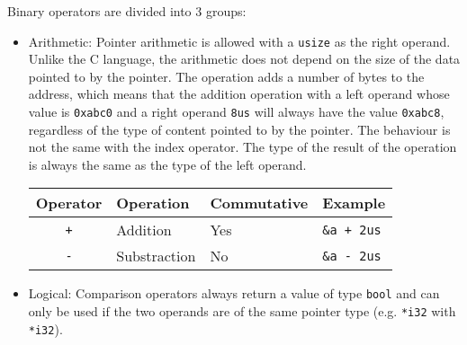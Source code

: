 Binary operators are divided into 3 groups:
\begin{itemize}
\item Arithmetic: Pointer arithmetic is allowed with a \texttt{usize} as the
  right operand. Unlike the C language, the arithmetic does not depend on the
  size of the data pointed to by the pointer. The operation adds a number of
  bytes to the address, which means that the addition operation with a left
  operand whose value is \texttt{0xabc0} and a right operand \texttt{8us} will
  always have the value \texttt{0xabc8}, regardless of the type of content
  pointed to by the pointer. The behaviour is not the same with the index
  operator. The type of the result of the operation is always the same as the
  type of the left operand.

  \begin{center}\begin{adjustbox}{max width=1\linewidth}
    \begin{tabular}{|c|lll|}
      \hline
      Operator & Operation & Commutative & Example \\
      \hline
      \hline
      \texttt{+} & Addition & Yes & \texttt{\&a + 2us} \\
      \texttt{-} & Substraction & No & \texttt{\&a - 2us} \\
      \hline
    \end{tabular}
  \end{adjustbox}\end{center}

\item Logical: Comparison operators always return a value of type \texttt{bool}
  and can only be used if the two operands are of the same pointer type (e.g.
  \texttt{*i32} with \texttt{*i32}).


\end{itemize}
